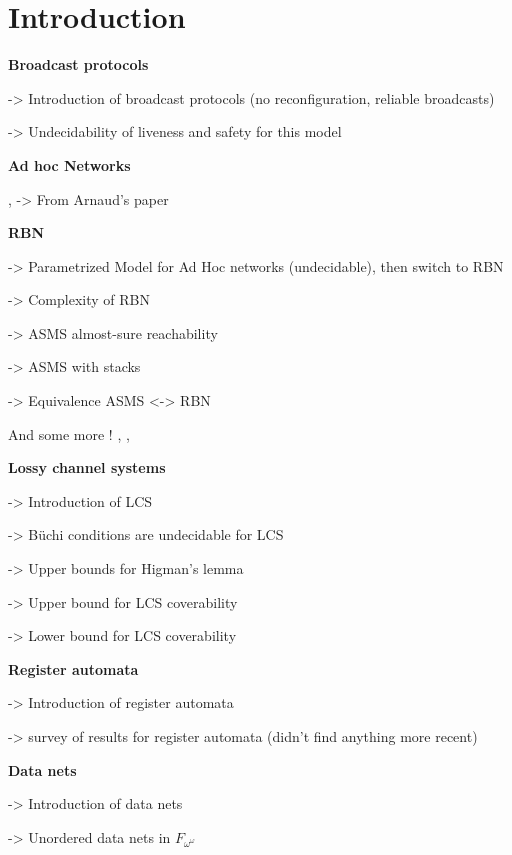 \section{Introduction}

	\textbf{Broadcast protocols}

	\cite{emerson1998model} -> Introduction of broadcast protocols (no reconfiguration, reliable broadcasts)
	
	\cite{EsparzaFM1999verification} -> Undecidability of liveness and safety for this model

	\textbf{Ad hoc Networks}

	\cite{Godskesen2007calculus}, \cite{Merro2007observational} -> From Arnaud's paper

	\textbf{RBN}
	
	\cite{DelzannoSZ2010Adhoc} -> Parametrized Model for Ad Hoc networks (undecidable), then switch to RBN
	
	\cite{Delzanno2012complexity} -> Complexity of RBN
	
	\cite{BouyerMRSS2016} -> ASMS almost-sure reachability
	
	\cite{fortin2017model} -> ASMS with stacks
	
	\cite{BalaW2021} -> Equivalence ASMS <-> RBN
	
	And some more ! \cite{BalasubramanianBM2018parameterized}, \cite{BalasubramanianGW2022parameterized}, 	\cite{ChiniMS2019liveness} 
	
	\textbf{Lossy channel systems}
	
	\cite{AbdullaJ1996verif} -> Introduction of LCS
	
	\cite{AbdullaJ1996undec} -> Büchi conditions are undecidable for LCS 
	
	\cite{SchmitzS2011upperHigman} -> Upper bounds for Higman's lemma
	
	\cite{ChambartS2008ordinal} -> Upper bound for LCS coverability 
	
	\cite{Schnoebelen2002verifying} -> Lower bound for LCS coverability 
	

	\textbf{Register automata}
	
	\cite{kaminski1994finite} -> Introduction of register automata
	
	\cite{segoufin2006automata} -> survey of results for register automata (didn't find anything more recent)
	
	\textbf{Data nets}
	
	\cite{lazic2007nets} -> Introduction of data nets
	
	\cite{ROSAVELARDO201741} -> Unordered data nets in $F_{\omega^\omega}$
	
